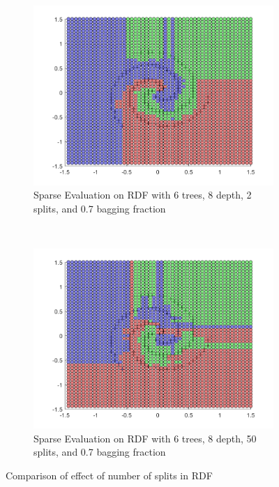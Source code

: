 \documentclass[a4paper, 10pt, conference]{ieeeconf}
\begin{document}
\begin{figure}[!ht]
  \captionsetup[subfigure]{position=b}
  \centering
    \begin{subfigure}{0.45\linewidth}
      \includegraphics[width=\textwidth]{img/tree_params/tree_sparse_6_8_2_7}
      \caption{Sparse Evaluation on RDF with 6 trees, 8 depth, 2 splits, and 0.7 bagging fraction}
      \label{fig:sparse_6_8_2_7}
    \end{subfigure}
    ~
    \begin{subfigure}{0.45\linewidth}
      \includegraphics[width=\textwidth]{img/tree_params/tree_sparse_6_8_50_7}
      \caption{Sparse Evaluation on RDF with 6 trees, 8 depth, 50 splits, and 0.7 bagging fraction}
      \label{fig:sparse_6_8_50_7}
    \end{subfigure}

  \caption{Comparison of effect of number of splits in RDF}
  \label{fig:compare_splits}
\end{figure}
\end{document}
